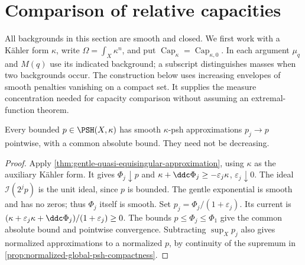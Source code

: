 \section{Comparison of relative capacities}
\label{sec:global-relative-capacity-comparison}
All backgrounds in this section are smooth and closed. We first work with a K\"ahler form $\kappa$, write $\Omega=\int_X\kappa^n$, and put
$\operatorname{Cap}_\kappa=\operatorname{Cap}_{\kappa,0}$. In each argument $\mu_q$ and $M(q)$ use its indicated background; a subscript distinguishes masses when two backgrounds occur. The construction below uses increasing envelopes of smooth penalties vanishing on a compact set. It supplies the measure concentration needed for capacity comparison without assuming an extremal-function theorem.

\begin{lemma}\label{lem:bounded-smooth-kahler-approximation}
Every bounded $p\in\PSH(X,\kappa)$ has smooth $\kappa$-psh approximations $p_j\to p$ pointwise, with a common absolute bound. They need not be decreasing.
\end{lemma}
\begin{proof}
Apply \cref{thm:gentle-quasi-equisingular-approximation}, using $\kappa$ as the auxiliary K\"ahler form. It gives $\Phi_j\downarrow p$ and
$\kappa+\ddc\Phi_j\geq-\varepsilon_j\kappa$, $\varepsilon_j\downarrow0$.
The ideal $\mathcal I(2^jp)$ is the unit ideal, since $p$ is bounded. The gentle exponential is smooth and has no zeros; thus $\Phi_j$ itself is smooth. Set $p_j=\Phi_j/(1+\varepsilon_j)$. Its current is
$(\kappa+\varepsilon_j\kappa+\ddc\Phi_j)/(1+\varepsilon_j)\geq0$.
The bounds $p\leq\Phi_j\leq\Phi_1$ give the common absolute bound and pointwise convergence. Subtracting $\sup_Xp_j$ also gives normalized approximations to a normalized $p$, by continuity of the supremum in \cref{prop:normalized-global-psh-compactness}.
\end{proof}

